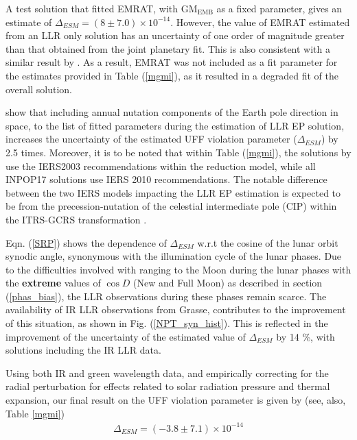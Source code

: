 \documentclass[fleqn,usenatbib,referee]{mnras}
\begin{document}
A test solution that fitted EMRAT, with GM$_{\textrm{EMB}}$ as a fixed parameter, gives an estimate of $\Delta_{ESM} = (8 \pm 7.0 ) \times10^{-14}$. However, the value of EMRAT estimated from an LLR only solution has an uncertainty of one order of magnitude greater than that obtained from the joint planetary fit. This is also consistent with a similar result by \cite{Williams2009}. As a result, EMRAT was not included as a fit parameter for the estimates provided in Table (\ref{mgmi}), as it resulted in a degraded fit of the overall solution.

\cite{Williams2012} show that including annual nutation components of the Earth pole direction in space, to the list of fitted parameters during the estimation of LLR EP solution, increases the uncertainty of the estimated UFF violation parameter ($\Delta_{ESM}$) by 2.5 times. Moreover, it is to be noted that within Table (\ref{mgmi}), the solutions by \cite{Williams2009,Williams2012,Muller2012} use the IERS2003 \cite[]{McCarthy2004} recommendations within the reduction model, while all INPOP17 solutions use IERS 2010 \cite[]{IERS2010} recommendations. The notable difference between the two IERS models impacting the LLR EP estimation is expected to be from the precession-nutation of the celestial intermediate pole (CIP) within the ITRS-GCRS transformation \citet[p.~8]{IERS2010}.

Eqn. (\ref{SRP}) shows the dependence of $\Delta_{ESM}$ w.r.t the cosine of the lunar orbit synodic angle, synonymous with the illumination cycle of the lunar phases. Due to the difficulties involved with ranging to the Moon during the lunar phases with the \textbf{extreme} values of $\cos{D}$ (New and Full Moon) as described in section (\ref{phas_bias}), the LLR observations during these phases remain scarce. The availability of IR LLR observations from Grasse, contributes to the improvement of this situation, as shown in Fig. (\ref{NPT_syn_hist}). This is reflected in the improvement of the uncertainty of the estimated value of $\Delta_{ESM}$ by 14 \%, with solutions including the IR LLR data. 

Using both IR and green wavelength data, and empirically correcting for the radial perturbation for effects related to solar radiation pressure and thermal expansion, our final result on the UFF violation parameter is given by (see, also, Table \ref{mgmi})
\begin{eqnarray} 
\label{eq:result}
\Delta_{ESM} = (-3.8 \pm 7.1) \times10^{-14}
\end{eqnarray}
\end{document}
